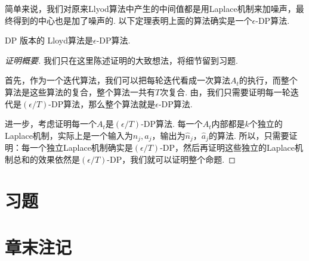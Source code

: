简单来说，我们对原来Llyod算法中产生的中间值都是用Laplace机制来加噪声，最终得到的中心也是加了噪声的. 以下定理表明上面的算法确实是一个$\epsilon$-DP算法. 
\begin{theorem}
    DP 版本的 Lloyd算法是$\epsilon$-DP算法.
\end{theorem}

\begin{proof}[证明概要]
我们只在这里陈述证明的大致想法，将细节留到习题.

首先，作为一个迭代算法，我们可以把每轮迭代看成一次算法$A_t$的执行，而整个算法是这些算法的复合，整个算法一共有$T$次复合. 由，我们只需要证明每一轮迭代是$(\epsilon/T)$-DP算法，那么整个算法就是$\epsilon$-DP算法.

进一步，考虑证明每一个$A_t$是$(\epsilon/T)$-DP算法. 每一个$A_t$内部都是$k$个独立的Laplace机制，实际上是一个输入为$n_j,a_j$，输出为$\hat{n}_j$，$\hat{a}_j$的算法. 所以，只需要证明：每一个独立Laplace机制确实是$(\epsilon/T)$-DP，然后再证明这些独立的Laplace机制总和的效果依然是$(\epsilon/T)$-DP，我们就可以证明整个命题.
\end{proof}

\section{习题}

\section{章末注记}
